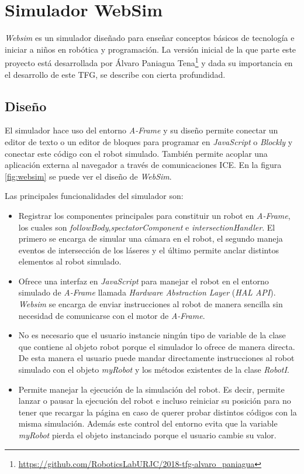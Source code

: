 \section{Simulador WebSim}

\textit{Websim} es un simulador diseñado para enseñar conceptos básicos de tecnología e iniciar a niños en robótica y programación. La versión inicial de la que parte este proyecto está desarrollada por Álvaro Paniagua Tena\footnote{\url{https://github.com/RoboticsLabURJC/2018-tfg-alvaro_paniagua}} y dada su  importancia en el desarrollo de este TFG, se describe con cierta profundidad.  

\subsection{Diseño}
\label{subsec:design}
El simulador hace uso del entorno \textit{A-Frame} y su diseño permite conectar un editor de texto o un editor de bloques para  programar en \textit{JavaScript} o \textit{Blockly} y conectar este código con el robot simulado. También permite acoplar una aplicación externa al navegador a través de comunicaciones ICE. En la figura \ref{fig:websim} se puede ver el diseño de \textit{WebSim}.

Las principales funcionalidades del simulador son: 

\begin{itemize}
    \item Registrar los componentes principales para constituir un robot en \textit{A-Frame}, los cuales son \textit{followBody},\textit{spectatorComponent} e \textit{intersectionHandler}. El primero se encarga de simular una cámara en el robot, el segundo maneja eventos de intersección de los láseres y el último permite anclar distintos elementos al robot simulado. 
    
    \item Ofrece una interfaz en \textit{JavaScript} para manejar el robot en el entorno simulado de \textit{A-Frame} llamada \textit{Hardware Abstraction Layer} (\textit{HAL API}). \textit{Websim} se encarga de enviar instrucciones al robot de manera sencilla sin necesidad de comunicarse con el motor de \textit{A-Frame}. 
    
    \item No es necesario que el usuario instancie ningún tipo de variable de la clase que contiene al objeto robot porque el simulador lo ofrece de manera directa. De esta manera el usuario puede mandar directamente instrucciones al robot simulado con el objeto \textit{myRobot} y los métodos existentes de la clase \textit{RobotI}.
    
    \item Permite manejar la ejecución de la simulación del robot. Es decir, permite lanzar o pausar la ejecución del robot e incluso reiniciar su posición para no tener que recargar la página en caso de querer probar distintos códigos con la misma simulación. Además este control del entorno evita que la variable \textit{myRobot} pierda el objeto instanciado porque el usuario cambie su valor.
    
\end{itemize}

